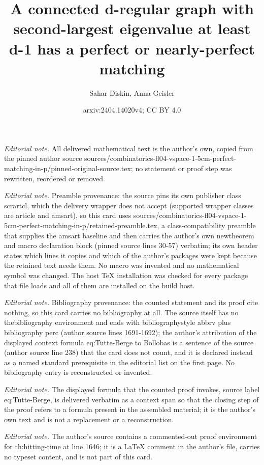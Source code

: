 \documentclass[10pt,a4paper]{amsart}
\title{A connected d-regular graph with second-largest eigenvalue at least d-1 has a perfect or nearly-perfect matching}
\author{Sahar Diskin, Anna Geisler}
\date{arxiv:2404.14020v4; CC BY 4.0}
\begin{document}
\maketitle
\noindent\textit{Editorial note.} All delivered mathematical text is the author's own, copied from the pinned author source sources/combinatorics-fl04-vspace-1-5cm-perfect-matching-in-p/pinned-original-source.tex; no statement or proof step was rewritten, reordered or removed.\par\medskip
\noindent\textit{Editorial note.} Preamble provenance: the source pins its own publisher class scrartcl, which the delivery wrapper does not accept (supported wrapper classes are article and amsart), so this card uses sources/combinatorics-fl04-vspace-1-5cm-perfect-matching-in-p/retained-preamble.tex, a class-compatibility preamble that supplies the amsart baseline and then carries the author's own newtheorem and macro declaration block (pinned source lines 30-57) verbatim; its own header states which lines it copies and which of the author's packages were kept because the retained text needs them. No macro was invented and no mathematical symbol was changed. The host TeX installation was checked for every package that file loads and all of them are installed on the build host.\par\medskip
\noindent\textit{Editorial note.} Bibliography provenance: the counted statement and its proof cite nothing, so this card carries no bibliography at all. The source itself has no thebibliography environment and ends with bibliographystyle abbrv plus bibliography perc (author source lines 1691-1692); the author's attribution of the displayed context formula eq:Tutte-Berge to Bollobas is a sentence of the source (author source line 238) that the card does not count, and it is declared instead as a named standard prerequisite in the editorial list on the first page. No bibliography entry is reconstructed or invented.\par\medskip
\noindent\textit{Editorial note.} The displayed formula that the counted proof invokes, source label eq:Tutte-Berge, is delivered verbatim as a context span so that the closing step of the proof refers to a formula present in the assembled material; it is the author's own text and is not a replacement or a reconstruction.\par\medskip
\noindent\textit{Editorial note.} The author's source contains a commented-out proof environment for th:hitting-time at line 1646; it is a LaTeX comment in the author's file, carries no typeset content, and is not part of this card.\par\medskip
\end{document}
